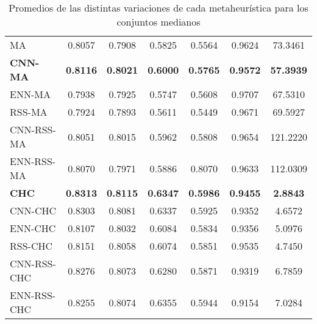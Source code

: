 \begin{table}[h!]
\begin{tabular}{l c c c c c c}
\hline

MA   & 0.8057 & 0.7908 & 0.5825 & 0.5564 & 0.9624 & 73.3461 \\
\textbf{CNN-MA} & \textbf{0.8116} & \textbf{0.8021} & \textbf{0.6000} & \textbf{0.5765} & \textbf{0.9572} & \textbf{57.3939} \\
ENN-MA & 0.7938 & 0.7925 & 0.5747 & 0.5608 & 0.9707 & 67.5310 \\
RSS-MA & 0.7924 & 0.7893 & 0.5611 & 0.5449 & 0.9671 & 69.5927 \\
CNN-RSS-MA & 0.8051 & 0.8015 & 0.5962 & 0.5808 & 0.9654 & 121.2220 \\
ENN-RSS-MA & 0.8070 & 0.7971 & 0.5886 & 0.8070 & 0.9633 & 112.0309 \\

\hline

\textbf{CHC} & \textbf{0.8313} & \textbf{0.8115} & \textbf{0.6347} & \textbf{0.5986} & \textbf{0.9455} & \textbf{2.8843} \\
CNN-CHC & 0.8303 & 0.8081 & 0.6337 & 0.5925 & 0.9352 & 4.6572 \\
ENN-CHC & 0.8107 & 0.8032 & 0.6084 & 0.5834 & 0.9356 & 5.0976 \\
RSS-CHC & 0.8151 & 0.8058 & 0.6074 & 0.5851 & 0.9535 & 4.7450 \\
CNN-RSS-CHC & 0.8276 & 0.8073 & 0.6280 & 0.5871 & 0.9319 & 6.7859 \\
ENN-RSS-CHC  & 0.8255 & 0.8074 & 0.6355 & 0.5944 & 0.9154 & 7.0284 \\


\hline
\end{tabular}
\caption{Promedios de las distintas variaciones de cada metaheurística para los conjuntos medianos}
\label{med-all}
\end{table}

